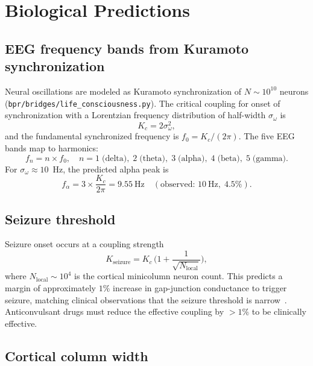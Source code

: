 \documentclass[aps,prd,twocolumn,superscriptaddress,longbibliography,nofootinbib]{revtex4-2}
\begin{document}
\section{Biological Predictions}
\label{sec:bio}

\subsection{EEG frequency bands from Kuramoto synchronization}

Neural oscillations are modeled as Kuramoto synchronization of
$N \sim 10^{10}$ neurons
(\texttt{bpr/bridges/life\_consciousness.py}).  The critical
coupling for onset of synchronization with a Lorentzian frequency
distribution of half-width $\sigma_\omega$ is
\begin{equation}
K_c = 2\sigma_\omega^2,
\label{eq:Kc}
\end{equation}
and the fundamental synchronized frequency is $f_0 = K_c/(2\pi)$.
The five EEG bands map to harmonics:
\begin{equation}
f_n = n \times f_0, \quad n = 1\;\text{(delta)},\; 2\;\text{(theta)},
\; 3\;\text{(alpha)},\; 4\;\text{(beta)},\; 5\;\text{(gamma)}.
\label{eq:eeg_bands}
\end{equation}
For $\sigma_\omega \approx 10$~Hz, the predicted alpha peak is
\begin{equation}
f_\alpha = 3 \times \frac{K_c}{2\pi} = 9.55~\text{Hz}
\quad (\text{observed: } 10~\text{Hz},\; 4.5\%).
\label{eq:alpha_peak}
\end{equation}

\subsection{Seizure threshold}

Seizure onset occurs at a coupling strength
\begin{equation}
K_{\mathrm{seizure}} = K_c\,\biggl(1 +
  \frac{1}{\sqrt{N_{\mathrm{local}}}}\biggr),
\label{eq:seizure}
\end{equation}
where $N_{\mathrm{local}} \sim 10^4$ is the cortical minicolumn
neuron count.  This predicts a margin of approximately $1\%$
increase in gap-junction conductance to trigger seizure, matching
clinical observations that the seizure threshold is
narrow~\cite{Breakspear2006}.  Anticonvulsant drugs must reduce the
effective coupling by $> 1\%$ to be clinically effective.

\subsection{Cortical column width}
\end{document}
